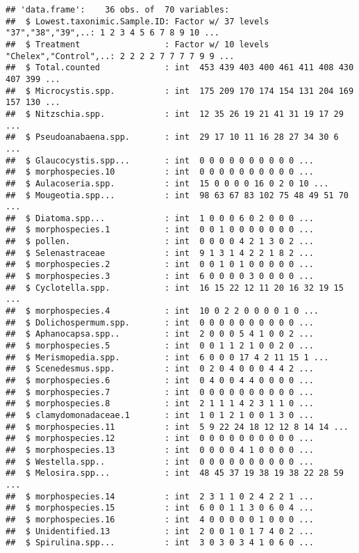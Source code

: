 \documentclass[]{article}
\begin{document}
\begin{verbatim}
## 'data.frame':    36 obs. of  70 variables:
##  $ Lowest.taxonimic.Sample.ID: Factor w/ 37 levels "37","38","39",..: 1 2 3 4 5 6 7 8 9 10 ...
##  $ Treatment                 : Factor w/ 10 levels "Chelex","Control",..: 2 2 2 2 7 7 7 7 9 9 ...
##  $ Total.counted             : int  453 439 403 400 461 411 408 430 407 399 ...
##  $ Microcystis.spp.          : int  175 209 170 174 154 131 204 169 157 130 ...
##  $ Nitzschia.spp.            : int  12 35 26 19 21 41 31 19 17 29 ...
##  $ Pseudoanabaena.spp.       : int  29 17 10 11 16 28 27 34 30 6 ...
##  $ Glaucocystis.spp...       : int  0 0 0 0 0 0 0 0 0 0 ...
##  $ morphospecies.10          : int  0 0 0 0 0 0 0 0 0 0 ...
##  $ Aulacoseria.spp.          : int  15 0 0 0 0 16 0 2 0 10 ...
##  $ Mougeotia.spp...          : int  98 63 67 83 102 75 48 49 51 70 ...
##  $ Diatoma.spp...            : int  1 0 0 0 6 0 2 0 0 0 ...
##  $ morphospecies.1           : int  0 0 1 0 0 0 0 0 0 0 ...
##  $ pollen.                   : int  0 0 0 0 4 2 1 3 0 2 ...
##  $ Selenastraceae            : int  9 1 3 1 4 2 2 1 8 2 ...
##  $ morphospecies.2           : int  0 0 1 0 1 0 0 0 0 0 ...
##  $ morphospecies.3           : int  6 0 0 0 0 3 0 0 0 0 ...
##  $ Cyclotella.spp.           : int  16 15 22 12 11 20 16 32 19 15 ...
##  $ morphospecies.4           : int  10 0 2 2 0 0 0 0 1 0 ...
##  $ Dolichospermum.spp.       : int  0 0 0 0 0 0 0 0 0 0 ...
##  $ Aphanocapsa.spp..         : int  2 0 0 0 5 4 1 0 0 2 ...
##  $ morphospecies.5           : int  0 0 1 1 2 1 0 0 2 0 ...
##  $ Merismopedia.spp.         : int  6 0 0 0 17 4 2 11 15 1 ...
##  $ Scenedesmus.spp.          : int  0 2 0 4 0 0 0 4 4 2 ...
##  $ morphospecies.6           : int  0 4 0 0 4 4 0 0 0 0 ...
##  $ morphospecies.7           : int  0 0 0 0 0 0 0 0 0 0 ...
##  $ morphospecies.8           : int  2 1 1 1 4 2 3 1 1 0 ...
##  $ clamydomonadaceae.1       : int  1 0 1 2 1 0 0 1 3 0 ...
##  $ morphospecies.11          : int  5 9 22 24 18 12 12 8 14 14 ...
##  $ morphospecies.12          : int  0 0 0 0 0 0 0 0 0 0 ...
##  $ morphospecies.13          : int  0 0 0 0 4 1 0 0 0 0 ...
##  $ Westella.spp..            : int  0 0 0 0 0 0 0 0 0 0 ...
##  $ Melosira.spp...           : int  48 45 37 19 38 19 38 22 28 59 ...
##  $ morphospecies.14          : int  2 3 1 1 0 2 4 2 2 1 ...
##  $ morphospecies.15          : int  6 0 0 1 1 3 0 6 0 4 ...
##  $ morphospecies.16          : int  4 0 0 0 0 0 1 0 0 0 ...
##  $ Unidentified.13           : int  2 0 0 1 0 1 7 4 0 2 ...
##  $ Spirulina.spp...          : int  3 0 3 0 3 4 1 0 6 0 ...

\end{verbatim}
\end{document}
